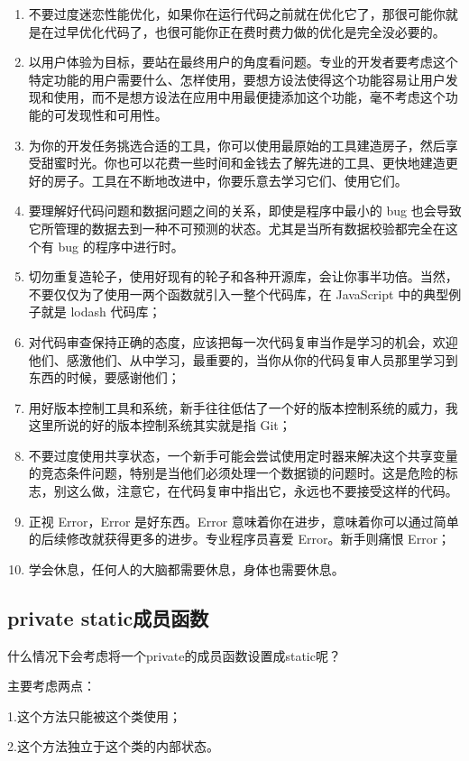 \begin{enumerate}
    \item 不要过度迷恋性能优化，如果你在运行代码之前就在优化它了，那很可能你就是在过早优化代码了，也很可能你正在费时费力做的优化是完全没必要的。
    \item 以用户体验为目标，要站在最终用户的角度看问题。专业的开发者要考虑这个特定功能的用户需要什么、怎样使用，要想方设法使得这个功能容易让用户发现和使用，而不是想方设法在应用中用最便捷添加这个功能，毫不考虑这个功能的可发现性和可用性。
    \item 为你的开发任务挑选合适的工具，你可以使用最原始的工具建造房子，然后享受甜蜜时光。你也可以花费一些时间和金钱去了解先进的工具、更快地建造更好的房子。工具在不断地改进中，你要乐意去学习它们、使用它们。
    \item 要理解好代码问题和数据问题之间的关系，即使是程序中最小的 bug 也会导致它所管理的数据去到一种不可预测的状态。尤其是当所有数据校验都完全在这个有 bug 的程序中进行时。
    \item 切勿重复造轮子，使用好现有的轮子和各种开源库，会让你事半功倍。当然，不要仅仅为了使用一两个函数就引入一整个代码库，在 JavaScript 中的典型例子就是 lodash 代码库；
    \item 对代码审查保持正确的态度，应该把每一次代码复审当作是学习的机会，欢迎他们、感激他们、从中学习，最重要的，当你从你的代码复审人员那里学习到东西的时候，要感谢他们；
    \item 用好版本控制工具和系统，新手往往低估了一个好的版本控制系统的威力，我这里所说的好的版本控制系统其实就是指 Git；
    \item 不要过度使用共享状态，一个新手可能会尝试使用定时器来解决这个共享变量的竞态条件问题，特别是当他们必须处理一个数据锁的问题时。这是危险的标志，别这么做，注意它，在代码复审中指出它，永远也不要接受这样的代码。
    \item 正视 Error，Error 是好东西。Error 意味着你在进步，意味着你可以通过简单的后续修改就获得更多的进步。专业程序员喜爱 Error。新手则痛恨 Error；
    \item 学会休息，任何人的大脑都需要休息，身体也需要休息。
\end{enumerate}
\subsection{private static成员函数}
什么情况下会考虑将一个private的成员函数设置成static呢？

主要考虑两点：

1.这个方法只能被这个类使用；

2.这个方法独立于这个类的内部状态。

